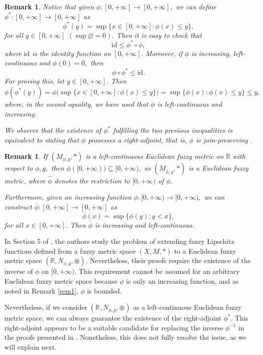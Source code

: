 \documentclass[12pt]{amsart}
\newtheorem{remark}[theorem]{Remark}
\begin{document}
	
	\begin{remark}
		Notice that given $\phi:[0,+\infty]\to [0,+\infty],$ we can define $\phi^*:[0,+\infty]\to [0,+\infty]$ as
		$$\phi^*(y)=\sup\{x\in [0,+\infty]:\phi(x)\leq y\},$$
		for all $y\in [0,+\infty]$ $(\sup\varnothing =0).$ Then it is easy to check that 
		$$\mathrm{id}\leq \phi^*\circ \phi,$$
		where $\mathrm{id}$ is the identity function on $[0,+\infty].$ Moreover, if $\phi$ is increasing, left-continuous and $\phi(0)=0,$ then
		$$\phi\circ\phi^\ast\leq \mathrm{id}.$$
		For proving this, let $y\in [0,+\infty].$ Then
		$$\phi(\phi^\ast (y))=\phi\big(\sup \{x\in [0,+\infty]:\phi(x)\leq y\}\big)=\sup\{\phi(x): \phi(x)\leq y\}\leq y,$$
		where, in the second equality, we have used that $\phi$ is left-continuous and increasing.
		
		We observe that the existence of $\phi^*$ fulfilling the two previous inequalities is equivalent to stating that $\phi$ possesses a right-adjoint, that is, $\phi$ is join-preserving \cite{BookQuantales}.
	\end{remark}
	
	
	
	
	
	
	
	\begin{remark}
		If $(M_{\phi,g},\ast)$ is a left-continuous Euclidean fuzzy metric on $\mathbb{R}$ with respect to $\phi,g,$ then $\phi([0,+\infty))\subseteq [0,+\infty),$ so $(M_{\hat{\phi},g},\ast)$ is a Euclidean fuzzy metric, where $\hat{\phi}$ denotes the restriction to $[0,+\infty)$ of $\phi$.
		
		Furthermore, given an increasing function $\phi:[0,+\infty)\to [0,+\infty),$ we can construct $\bar{\phi}:[0,+\infty]\to [0,+\infty]$ as
		$$\bar{\phi}(x)=\sup \{\phi(y):y<x\},$$
		for all $x\in [0,+\infty].$ Then $\bar{\phi}$ is increasing and left-continuous.
	\end{remark}
	
	
	In Section 5 of \cite{JFRLSP21}, the authors study the problem of extending fuzzy Lipschitz functions defined from a fuzzy metric space $(X,M,\ast)$ to a Euclidean fuzzy metric space $(\mathbb{R},N_{\phi,g},\circledast).$ Nevertheless, their proofs require the existence of the inverse of $\phi$ on $[0,+\infty).$ This requirement cannot be assumed for an arbitrary Euclidean fuzzy metric space because $\phi$ is only an increasing function, and as noted in Remark \ref{rem1}, $\phi$ is bounded.
	
	
	Nevertheless, if we consider $(\mathbb{R},N_{\phi,g},\circledast)$ as a left-continuous Euclidean fuzzy metric space, we can always guarantee the existence of the right-adjoint $\phi^*.$ This right-adjoint appears to be a suitable candidate for replacing the inverse $\phi^{-1}$ in the proofs presented in \cite{JFRLSP21}. Nonetheless, this does not fully resolve the issue, as we will explain next.
	
\end{document}
